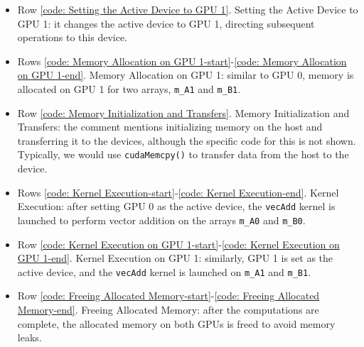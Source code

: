 \begin{examplebox}
\begin{itemize}
    \item Row \ref{code: Setting the Active Device to GPU 1}. Setting the Active Device to GPU 1: it changes the active device to GPU 1, directing subsequent operations to this device.

    \item Rows \ref{code: Memory Allocation on GPU 1-start}-\ref{code: Memory Allocation on GPU 1-end}. Memory Allocation on GPU 1: similar to GPU 0, memory is allocated on GPU 1 for two arrays, \texttt{m\_A1} and \texttt{m\_B1}.
    
    \item Row \ref{code: Memory Initialization and Transfers}. Memory Initialization and Transfers: the comment mentions initializing memory on the host and transferring it to the devices, although the specific code for this is not shown. Typically, we would use \texttt{cudaMemcpy()} to transfer data from the host to the device.

    \item Rows \ref{code: Kernel Execution-start}-\ref{code: Kernel Execution-end}. Kernel Execution: after setting GPU 0 as the active device, the \texttt{vecAdd} kernel is launched to perform vector addition on the arrays \texttt{m\_A0} and \texttt{m\_B0}.

    \item Row \ref{code: Kernel Execution on GPU 1-start}-\ref{code: Kernel Execution on GPU 1-end}. Kernel Execution on GPU 1: similarly, GPU 1 is set as the active device, and the \texttt{vecAdd} kernel is launched on \texttt{m\_A1} and \texttt{m\_B1}.

    \item Row \ref{code: Freeing Allocated Memory-start}-\ref{code: Freeing Allocated Memory-end}. Freeing Allocated Memory: after the computations are complete, the allocated memory on both GPUs is freed to avoid memory leaks.
  \end{itemize}
\end{examplebox}

\newpage

